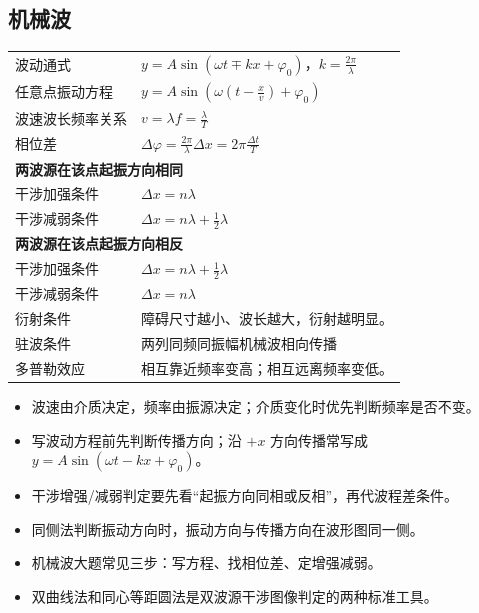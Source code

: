 \subsection{机械波}

\begin{tabularx}{\columnwidth}{XX}
  波动通式      & $y=A\sin(\omega t\mp kx+\varphi_0)$，$k=\frac{2\pi}{\lambda}$ \\
  任意点振动方程  & $y=A\sin(\omega (t-\frac{x}{v})+\varphi_0)$ \\
  波速波长频率关系 & $v=\lambda f=\frac{\lambda}{T}$  \\
  相位差       & $\Delta\varphi=\frac{2\pi}{\lambda}\Delta x=2\pi\frac{\Delta t}{T}$ \\
  \multicolumn{2}{l}{\textbf{两波源在该点起振方向相同}} \\
  干涉加强条件   & $\Delta x=n\lambda$ \\
  干涉减弱条件   & $\Delta x=n\lambda+\frac12\lambda$  \\
  \multicolumn{2}{l}{\textbf{两波源在该点起振方向相反}} \\
  干涉加强条件   & $\Delta x=n\lambda+\frac12\lambda$ \\
  干涉减弱条件   & $\Delta x=n\lambda$ \\
  衍射条件     & 障碍尺寸越小、波长越大，衍射越明显。\\
  驻波条件     & 两列同频同振幅机械波相向传播\\
  多普勒效应    & 相互靠近频率变高；相互远离频率变低。\\
\end{tabularx}

\begin{formulanotebox}
\begin{itemize}[leftmargin=1.5em]
  \item 波速由介质决定，频率由振源决定；介质变化时优先判断频率是否不变。
  \item 写波动方程前先判断传播方向；沿 $+x$ 方向传播常写成 $y=A\sin(\omega t-kx+\varphi_0)$。
  \item 干涉增强/减弱判定要先看“起振方向同相或反相”，再代波程差条件。
  \item 同侧法判断振动方向时，振动方向与传播方向在波形图同一侧。
\end{itemize}
\end{formulanotebox}

\begin{keypointbox}
\begin{itemize}[leftmargin=1.5em]
  \item 机械波大题常见三步：写方程、找相位差、定增强减弱。
  \item 双曲线法和同心等距圆法是双波源干涉图像判定的两种标准工具。
\end{itemize}
\end{keypointbox}

